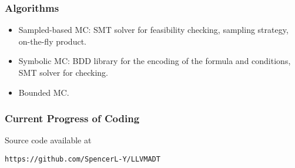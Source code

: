 \documentclass[11pt]{beamer}
\begin{document}
\begin{frame}\frametitle{Algorithms}
\begin{itemize}
\item  Sampled-based MC: SMT solver for feasibility checking, sampling strategy, on-the-fly product.
\item Symbolic MC: BDD library for the encoding of the formula and conditions, SMT solver for checking.

\item Bounded MC.

\end{itemize}
\end{frame}


\begin{frame}\frametitle{Current Progress of Coding}
Source code available at
\begin{center}
\texttt{https://github.com/SpencerL-Y/LLVMADT}
\end{center}
\end{frame}
\end{document}
